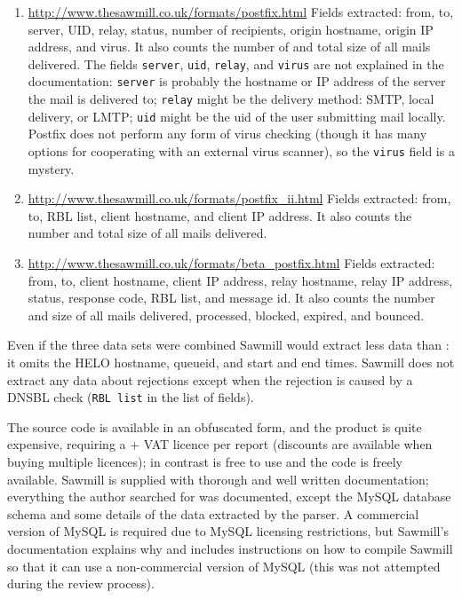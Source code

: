 \begin{enumerate}

    \item \url{http://www.thesawmill.co.uk/formats/postfix.html} \newline{}
        Fields extracted: from, to, server, UID, relay, status, number of
        recipients, origin hostname, origin \gls{IP} address, and virus.
        It also counts the number of and total size of all mails delivered.
        The fields \texttt{server}, \texttt{uid}, \texttt{relay}, and
        \texttt{virus} are not explained in the documentation:
        \texttt{server} is probably the hostname or \gls{IP} address of the
        server the mail is delivered to; \texttt{relay} might be the
        delivery method: \gls{SMTP}, local delivery, or \gls{LMTP};
        \texttt{uid} might be the uid of the user submitting mail locally.
        Postfix does not perform any form of virus checking (though it has
        many options for cooperating with an external virus scanner), so
        the \texttt{virus} field is a mystery.

    \item \url{http://www.thesawmill.co.uk/formats/postfix_ii.html}
        \newline{} Fields extracted: from, to, RBL list, client hostname,
        and client \gls{IP} address.  It also counts the number and total
        size of all mails delivered.  

    \item \url{http://www.thesawmill.co.uk/formats/beta_postfix.html}
        \newline{} Fields extracted: from, to, client hostname, client
        \gls{IP} address, relay hostname, relay \gls{IP} address, status,
        response code, RBL list, and message id.  It also counts the number
        and size of all mails delivered, processed, blocked, expired, and
        bounced.

\end{enumerate}

Even if the three data sets were combined Sawmill would extract less data
than \parsername{}: it omits the HELO hostname, queueid, and start and end
times.  Sawmill does not extract any data about rejections except when the
rejection is caused by a \gls{DNSBL} check (\texttt{RBL list} in the list
of fields).

The source code is available in an obfuscated form, and the product is
quite expensive, requiring a  + VAT licence per report
(discounts are available when buying multiple licences); in contrast
\parsername{} is free to use and the code is freely available.  Sawmill is
supplied with thorough and well written documentation; everything the
author searched for was documented, except the MySQL database schema and
some details of the data extracted by the parser.  A commercial version of
MySQL is required due to MySQL licensing restrictions, but Sawmill's
documentation explains why and includes instructions on how to compile
Sawmill so that it can use a non-commercial version of MySQL (this was not
attempted during the review process).

